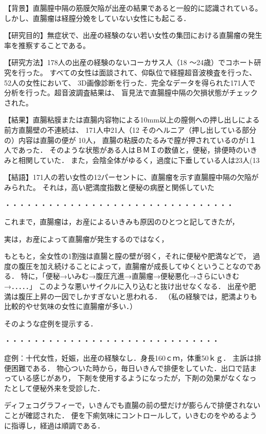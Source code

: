 【背景】直腸膣中隔の筋膜欠陥が出産の結果であると一般的に認識されている。
しかし、直腸瘤は経膣分娩をしていない女性にも起こる．

【研究目的】無症状で、出産の経験のない若い女性の集団における直腸瘤の発生率を推察することである。

【研究方法】178人の出産の経験のないコーカサス人（18 ～24歳）でコホート研究を行った。
すべての女性は面談されて、仰臥位で経膣超音波検査を行った、52人の女性において、
3D画像診断を行った．完全なデータを得られた171人で分析を行った。超音波調査結果は、
盲見法で直腸膣中隔の欠損状態がチェックされた。

【結果】直腸粘膜または直腸内容物による10mm以上の膣側への押し出しによる前方直腸壁の不連続は、
171人中21人（12%
そのヘルニア（押し出している部分の）内容は直腸の便が 10人，
直腸の粘膜のたるみで膣が押されているのが1１人であった．
そのような状態がある人はＢＭＩの数値と，便秘，排便時のいきみと相関していた．
また，会陰全体がゆるく，過度に下垂している人は23人(13%

【結語】171人の若い女性の12パーセントに、直腸瘤を示す直腸膣中隔の欠陥がみられた。
それは，高い肥満度指数と便秘の病歴と関係していた

・・・・・・・・・・・・・・・・・・・・・・・・・・・・・・・・

これまで，直腸瘤は，お産によるいきみも原因のひとつと記してきたが，

実は，お産によって直腸瘤が発生するのではなく，

もともと，全女性の1割強は直腸と膣の壁が弱く，それに便秘や肥満などで，
過度の腹圧を加え続けることによって，直腸瘤が成長してゆくということなのである．
特に，「便秘→いみむ→腹圧亢進→直腸瘤→便秘悪化→さらにいきむ→．．．．．」
このような悪いサイクルに入り込むと抜け出せなくなる．
出産や肥満は腹圧上昇の一因でしかすぎないと思われる．
（私の経験では，肥満よりも比較的やせ気味の女性に直腸瘤が多い．）




そのような症例を提示する．

・・・・・・・・・・・・・・・・・・・・・・・・・・・・・・

症例：十代女性，妊娠，出産の経験なし．身長160ｃｍ，体重50ｋｇ．
主訴は排便困難である．
物心ついた時から，毎日いきんで排便をしていた．出口で詰まっている感じがあり，
下剤を使用するようになったが，下剤の効果がなくなったとして便秘外来を受診した．




ディフェコグラフィーで，いきんでも直腸の前の壁だけが膨らんで排便されないことが確認された．
便を下痢気味にコントロールして，いきむのをやめるように指導し，経過は順調である．


